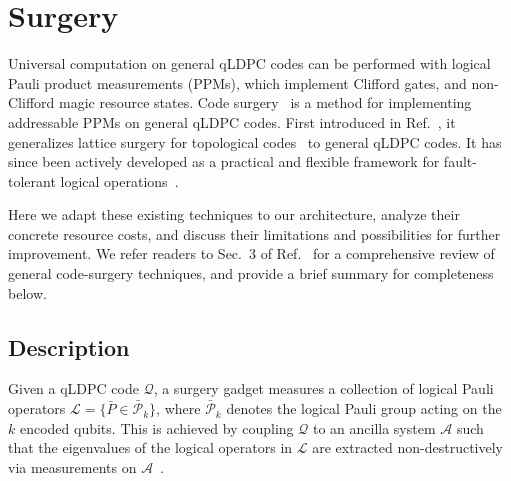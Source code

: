 \documentclass[reprint,twocolumn,secnumarabic,amssymb, aps, prx]{revtex4-2}
\begin{document}
\section{Surgery\label{app:surgery}}
Universal computation on general qLDPC codes can be performed with logical Pauli product measurements (PPMs), which implement Clifford gates, and non-Clifford magic resource states. Code surgery~\cite{cohen2022low, cross2024improved, williamson2024low, ide2024fault} is a method for implementing addressable PPMs on general qLDPC codes. First introduced in Ref.~\cite{cohen2022low}, it generalizes lattice surgery for topological codes~\cite{horsman2012surface} to general qLDPC codes. It has since been actively developed as a practical and flexible framework for fault-tolerant logical operations~\cite{cross2024improved, williamson2024low, ide2024fault, he2025extractors, swaroop2024universal, zhang2025time, cowtan2025parallel, zheng2025high}.

Here we adapt these existing techniques to our architecture, analyze their concrete resource costs, and discuss their limitations and possibilities for further improvement. We refer readers to Sec.~3 of Ref.~\cite{he2025extractors} for a comprehensive review of general code-surgery techniques, and provide a brief summary for completeness below. 

\subsection{Description \label{app:surgery_description}}
Given a qLDPC code $\mathcal{Q}$, a surgery gadget measures a collection of logical Pauli operators $\mathcal{L}= \{\bar{P} \in \bar{\mathcal{P}}_k\}$, where $\bar{\mathcal{P}}_k$ denotes the logical Pauli group acting on the $k$ encoded qubits. This is achieved by coupling $\mathcal{Q}$ to an ancilla system $\mathcal{A}$ such that the eigenvalues of the logical operators in $\mathcal{L}$ are extracted non-destructively via measurements on $\mathcal{A}$~\cite{cohen2022low, cross2024improved, williamson2024low}. 
\end{document}
